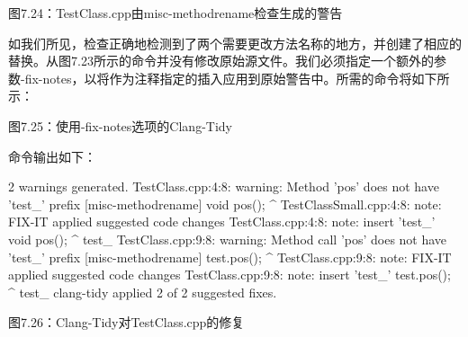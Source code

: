 \begin{center}
图7.24：TestClass.cpp由misc-methodrename检查生成的警告
\end{center}

如我们所见，检查正确地检测到了两个需要更改方法名称的地方，并创建了相应的替换。从图7.23所示的命令并没有修改原始源文件。我们必须指定一个额外的参数-fix-notes，以将作为注释指定的插入应用到原始警告中。所需的命令将如下所示：



\begin{center}
图7.25：使用-fix-notes选项的Clang-Tidy
\end{center}

命令输出如下：

\begin{shell}
2 warnings generated.
TestClass.cpp:4:8: warning: Method 'pos' does not have 'test_' prefix
[misc-methodrename]
  void pos(){};
       ^
TestClassSmall.cpp:4:8: note: FIX-IT applied suggested code changes
TestClass.cpp:4:8: note: insert 'test_'
  void pos(){};
       ^
       test_
TestClass.cpp:9:8: warning: Method call 'pos' does not have 'test_' prefix
[misc-methodrename]
  test.pos();
       ^
TestClass.cpp:9:8: note: FIX-IT applied suggested code changes
TestClass.cpp:9:8: note: insert 'test_'
  test.pos();
       ^
       test_
clang-tidy applied 2 of 2 suggested fixes.
\end{shell}


\begin{center}
图7.26：Clang-Tidy对TestClass.cpp的修复
\end{center}

